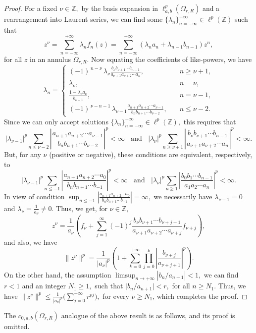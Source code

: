 \documentclass[12pt, reqno]{amsart}
\theoremstyle{definition}
\theoremstyle{remark}
\numberwithin{equation}{section}
\begin{document}
\begin{proof}
For a fixed $\nu\in\mathbb{Z},$  by the basis expansion in $\ell^{p}_{{a},{b}}(\Omega_{r,R})$ and a rearrangement into Laurent series, we can find some $\{\lambda_{n}\}_{n=-\infty}^{+\infty}\in \ell^p(\mathbb{Z})$ such that
 \begin{equation} \label{1}
    z^{\nu}= \sum_{n=-\infty }^{+\infty} \lambda_{n}f_{n}(z)=\sum_{n=-\infty}^{+\infty}\left(\lambda_{n}a_{n}+\lambda_{n-1}b_{n-1}\right)z^{n},
     \end{equation}
  for all $z$ in an annulus $\Omega_{r,R}$. Now equating the coefficients of like-powers, we have
\[
\lambda_n =
\begin{cases} 
(-1)^{\,n-\nu}\,\lambda_{\nu}
\frac{b_{\nu} b_{\nu+1} \cdots b_{n-1}}{a_{\nu+1} a_{\nu+2} \cdots a_{n}},
& \quad n \ge \nu+1, \\[1em]
\lambda_{\nu},
& \quad n = \nu, \\[0.5em]
\frac{1-\lambda_{\nu}a_{\nu}}{b_{\nu-1}},& \quad n = \nu-1, \\[1em]
(-1)^{\,\nu-n-1}\,\lambda_{\nu-1}
\frac{a_{n+1} a_{n+2} \cdots a_{\nu-1}}{b_{n} b_{n+1} \cdots b_{\nu-2}},
& \quad n \le \nu-2.
\end{cases}
\]
Since we can only accept solutions $\{\lambda_{n}\}_{n=-\infty}^{+\infty}\in \ell^p(\mathbb{Z}),$ this requires that 
\[
|\lambda_{\nu-1}|^{p}\sum_{n\le \nu-2}
\left|\frac{a_{n+1} a_{n+2} \cdots a_{\nu-1}}{b_{n} b_{n+1} \cdots b_{\nu-2}}\right|^{p}<\infty~~~~\text{and}~~~~|\lambda_{\nu}|^{p}\sum_{n\ge \nu+1}
\left|\frac{b_{\nu} b_{\nu+1} \cdots b_{n-1}}{a_{\nu+1} a_{\nu+2} \cdots a_{n}}\right|^{p}<\infty.
\]
But, for any $\nu$ (positive or negative), these conditions are equivalent, respectively, to 
\[
|\lambda_{\nu-1}|^{p}\sum_{n\le-1}
\left|\frac{a_{n+1} a_{n+2} \cdots a_{0}}{b_{n} b_{n+1} \cdots b_{-1}}\right|^{p}<\infty~~~~\text{and}~~~~|\lambda_{\nu}|^{p}\sum_{n\ge 1}
\left|\frac{b_{0} b_{1} \cdots b_{n-1}}{a_{1} a_{2} \cdots a_{n}}\right|^{p}<\infty.
\]
In view of condition $\sup_{n\leq -1} \left |\frac{a_{n+1}a_{n+2}\cdots a_0}{b_nb_{n+1}\cdots b_{-1}}\right|=\infty,$ we necessarily have $\lambda_{\nu-1}=0$ and $\lambda_{\nu}=\frac{1}{a_{\nu}}\neq 0.$
Thus, we get, for $\nu\in \mathbb{Z}$,
\begin{equation}\label{monomial-expansion}
    z^{\nu}=\frac{1}{a_{\nu}}\left(f_{\nu}+\sum_{j=1}^{\infty}(-1)^{j}\frac{b_{\nu}b_{\nu+1}\cdots b_{\nu+j-1}}{a_{\nu+1}a_{\nu+2}\cdots a_{\nu+j}}f_{\nu+j}\right),
\end{equation}
and also, we have
\[
\lVert z^{\nu}\rVert^{p}=\frac{1}{|a_{\nu}|^{p}}\left(1+\sum_{k=0}^{+\infty}
\prod_{j=0}^{k}\left|\frac{b_{\nu+j}}{a_{\nu+j+1}}\right|^{p}\right).
\]
On the other hand, the assumption $\limsup_{ n\rightarrow +\infty} \left\lvert b_n/a_{n+1}\right\rvert<1,$ we can find $r<1$ and an integer $N_1\geq 1,$ such that $\big|b_{n}/a_{n+1}\big|<r,$ for all $n\geq N_1.$ Thus, we have $\lVert z^{\nu}\rVert^{p}\leq \frac{1}{|a_{\nu}|^{p}}\big(\sum_{j=0}^{+\infty}r^{pj}\big),$ for every $\nu\geq N_{1}$, which completes the proof.
 \end{proof}
The $c_{0,a,b}(\Omega_{r,R})$ analogue of the above result is as follows, and its proof is omitted.
 
\end{document}
